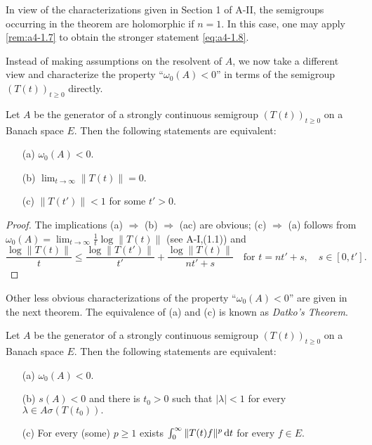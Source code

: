 \bigskip
\noindent In view of the characterizations given in Section 1 of A-II, the semigroups occurring in the theorem are holomorphic if \( n = 1 \). 
In this case, one may apply \eqref{rem:a4-1.7} to obtain the stronger statement \eqref{eq:a4-1.8}.

\bigskip\noindent Instead of making assumptions on the resolvent of \( A \), we now take a different view and characterize the property ``\( \omega_0(A) < 0 \)'' in terms of the semigroup \( (T(t))_{t \geq 0} \) directly.

\bigskip
\begin{proposition} \label{prop:a4-1.10} Let \( A \) be the generator of a strongly continuous semigroup \( (T(t))_{t \geq 0} \) on a Banach space $E$. 
Then the following statements are equivalent:
\begin{itemize}
\item[(a)] \( \omega_0(A) < 0 \).
\item[(b)] \( \lim_{t \to \infty} \| T(t) \| = 0 \).
\item[(c)] \( \| T(t') \| < 1 \) for some \( t' > 0 \).
\end{itemize}
\end{proposition}

\begin{proof}
The implications (a) \( \Rightarrow \) (b) \( \Rightarrow \) (ac) are obvious; (c) \( \Rightarrow \) (a) follows from  $\omega_0(A) = \lim_{t \to \infty} \frac{1}{t} \log \| T(t) \|$ (see A-I,(1.1)) and  
\[
\displaystyle
\frac{\log \|T(t)\|}{t} \leq \frac{\log \|T(t')\|}{t'} + \frac{\log \|T(t)\|}{nt' + s} \quad \text{for } t = nt' + s, \quad s \in [0,t'].
\]
\end{proof}

\noindent Other less obvious characterizations of the property ``\( \omega_0(A) < 0 \)'' are given in the next theorem. 
The equivalence of (a) and (c) is known as \emph{Datko’s Theorem}.


\begin{theorem} \label{thm:a4-1.11} Let \( A \) be the generator of a strongly continuous semigroup \( (T(t))_{t \geq 0} \) on a Banach space \( E \). 
Then the following statements are equivalent:
\begin{itemize}
\item[(a)] \( \omega_0(A) < 0 \).
\item[(b)] \( s(A) < 0 \) and there is \( t_0 > 0 \) such that  
\(
|\lambda| < 1\) for every \( \lambda \in A\sigma (T(t_0)).\)
\item[(c)] For every (some) \( p \geq 1 \) exists \( \int_{0}^{\infty} \| T(t) f \|^p\mathop{}\!\mathrm{d}{t} \) for every \( f \in E \).
\end{itemize}
\end{theorem}


